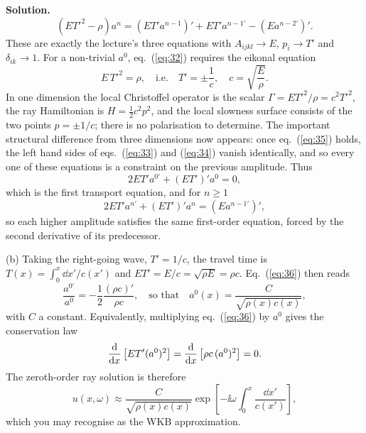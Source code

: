 \documentclass[a4paper,12pt]{paper}
\newenvironment{solution}{\par\noindent\textbf{Solution.}\ }{\par\medskip}
\begin{document}
\begin{solution}
\begin{equation}
\left(ET'^{2}-\rho\right)a^{n}=(ET'a^{n-1})'+ET'a^{n-1\prime}-(Ea^{n-2\prime})'.
\label{eq:34}
\end{equation}
These are exactly the lecture's three equations with $A_{ijkl}\to E$, $p_{i}\to T'$ and
$\delta_{ik}\to1$. For a non-trivial $a^{0}$, eq.~(\ref{eq:32}) requires the eikonal equation
\begin{equation}
E\,T'^{2}=\rho,\quad\text{i.e.}\quad T'=\pm\frac{1}{c},\quad c=\sqrt{\frac{E}{\rho}}.
\label{eq:35}
\end{equation}
In one dimension the local Christoffel operator is the scalar $\Gamma=ET'^{2}/\rho=c^{2}T'^{2}$, the
ray Hamiltonian is $H=\frac{1}{2}c^{2}p^{2}$, and the local slowness surface consists of the two
points $p=\pm1/c$; there is no polarisation to determine. The important structural difference from
three dimensions now appears: once eq.~(\ref{eq:35}) holds, the left hand sides of
eqs.~(\ref{eq:33}) and (\ref{eq:34}) vanish identically, and so every one of these equations is a
constraint on the previous amplitude. Thus
\begin{equation}
2ET'a^{0\prime}+(ET')'a^{0}=0,
\label{eq:36}
\end{equation}
which is the first transport equation, and for $n\ge1$
\begin{equation}
2ET'a^{n\prime}+(ET')'a^{n}=(Ea^{n-1\prime})',
\label{eq:37}
\end{equation}
so each higher amplitude satisfies the same first-order equation, forced by the second derivative
of its predecessor.

\noindent (b) Taking the right-going wave, $T'=1/c$, the travel time is $T(x)=\int_{0}^{x}\dd x'/c(x')$
and $ET'=E/c=\sqrt{\rho E}=\rho c$. Eq.~(\ref{eq:36}) then reads
\begin{equation}
\frac{a^{0\prime}}{a^{0}}=-\frac{1}{2}\frac{(\rho c)'}{\rho c},\quad\text{so that}\quad
a^{0}(x)=\frac{C}{\sqrt{\rho(x)c(x)}},
\label{eq:38}
\end{equation}
with $C$ a constant. Equivalently, multiplying eq.~(\ref{eq:36}) by $a^{0}$ gives the conservation
law
\begin{equation}
\frac{\mathrm{d}}{\mathrm{d} x}\left[ET'(a^{0})^{2}\right]=\frac{\mathrm{d}}{\mathrm{d} x}\left[\rho c\,(a^{0})^{2}\right]=0.
\label{eq:39}
\end{equation}
The zeroth-order ray solution is therefore
\begin{equation}
u(x,\omega)\approx\frac{C}{\sqrt{\rho(x)c(x)}}\exp\left[-\ii\omega\int_{0}^{x}\frac{\dd x'}{c(x')}\right],
\label{eq:40}
\end{equation}
which you may recognise as the WKB approximation.


\end{solution}
\end{document}
